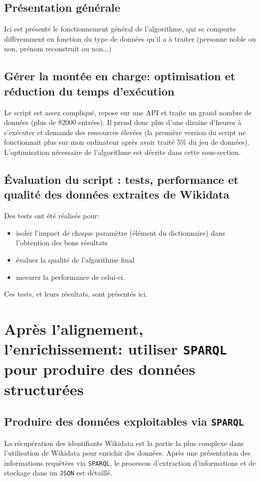 \documentclass[a4paper, 12pt, twoside]{book}
\newcommand{\json}{\texttt{JSON}}
\newcommand{\sparql}{\texttt{SPARQL}}
\begin{document}
\subsection{Présentation générale}
Ici est présenté le fonctionnement général de l'algorithme, qui se comporte différemment en fonction du type de données qu'il a à traiter (personne noble ou non, prénom reconstruit ou non...)

\subsection{Gérer la montée en charge: optimisation et réduction du temps d'exécution}
Le script est assez compliqué, repose sur une API et traite un grand nombre de données (plus de 82000 entrées). Il prend donc plus d'une dizaine d'heures à s'exécuter et demande des ressources élevées (la première version du script ne fonctionnait plus sur mon ordinateur après avoir traité 5\% du jeu de données). L'optimisation nécessaire de l'algorithme est décrite dans cette sous-section.

\subsection{Évaluation du script : tests, performance et qualité des données extraites de Wikidata}
Des tests ont été réalisés pour:
\begin{itemize}
	\item isoler l'impact de chaque paramètre (élément du dictionnaire) dans l'obtention des bons résultats
	\item évaluer la qualité de l'algorithme final
	\item mesurer la performance de celui-ci.
\end{itemize}
Ces tests, et leurs résultats, sont présentés ici.

\section{Après l'alignement, l'enrichissement: utiliser \sparql{} pour produire des données structurées}
\subsection{Produire des données exploitables via \sparql{}}
La récupération des identifiants Wikidata est la partie la plus complexe dans l'utilisation de Wikidata pour enrichir des données. Après une présentation des informations requêtées via \sparql{}, le processus d'extraction d'informations et de stockage dans un \json{} est détaillé.
\end{document}
